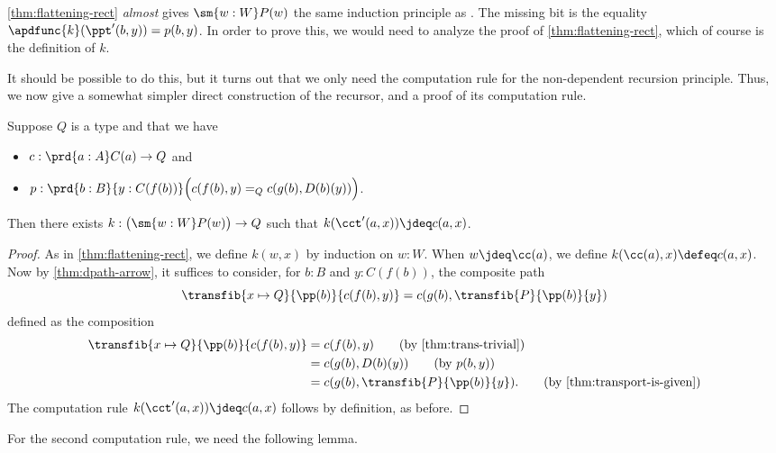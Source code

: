 \cref{thm:flattening-rect} \emph{almost} gives $\sm{w:W}P(w)$ the same induction principle as \Wtil.
The missing bit is the equality $\apdfunc{k}(\ppt'(b,y)) = p(b,y)$.
In order to prove this, we would need to analyze the proof of \cref{thm:flattening-rect}, which of course is the definition of $k$.

It should be possible to do this, but it turns out that we only need the computation rule for the non-dependent recursion principle.
Thus, we now give a somewhat simpler direct construction of the recursor, and a proof of its computation rule.

\begin{lem}\label{thm:flattening-rectnd}
  Suppose $Q$ is a type and that we have
  \begin{itemize}
  \item $c : \prd{a:A} C(a) \to Q$ and
  \item $p : \prd{b:B}{y:C(f(b))} \Big(c(f(b),y) =_Q c(g(b),D(b)(y))\Big)$.
  \end{itemize}
  Then there exists $k:\big(\sm{w:W} P(w)\big) \to Q$ such that $k(\cct'(a,x)) \jdeq c(a,x)$.
\end{lem}
\begin{proof}
  As in \cref{thm:flattening-rect}, we define $k(w,x)$ by induction on $w:W$.
  When $w\jdeq \cc(a)$, we define $k(\cc(a),x)\defeq c(a,x)$.
  Now by \cref{thm:dpath-arrow}, it suffices to consider, for $b:B$ and $y:C(f(b))$, the composite path
  \begin{equation}\label{eq:flattening-rectnd}
    \transfib{x\mapsto Q}{\pp(b)}{c(f(b),y)}
    = c(g(b),\transfib{P}{\pp(b)}{y})
  \end{equation}
  defined as the composition
  \begin{align}
    \transfib{x\mapsto Q}{\pp(b)}{c(f(b),y)}
    &= c(f(b),y) \tag{by \cref{thm:trans-trivial}}\\
    &= c(g(b),D(b)(y)) \tag{by $p(b,y)$}\\
    &= c(g(b),\transfib{P}{\pp(b)}{y}). \tag{by \cref{thm:transport-is-given}}
  \end{align}
  The computation rule $k(\cct'(a,x)) \jdeq c(a,x)$ follows by definition, as before.
\end{proof}

For the second computation rule, we need the following lemma.

